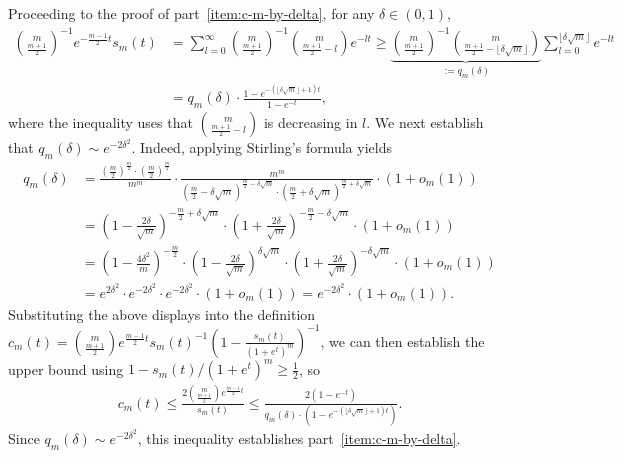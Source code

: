 \documentclass[11pt]{article}
\newcommand{\prn}[1]{\left({#1}\right)} %
\newcommand{\<}{\langle} %
\renewcommand{\>}{\rangle}
\newcommand{\half}{\frac{1}{2}}
\begin{document}
Proceeding to the proof of part~\ref{item:c-m-by-delta},
for any $\delta \in (0, 1)$,
\begin{align*}
  \binom{m}{\frac{m+1}{2}}^{-1} e^{-\frac{m-1}{2}t} s_m(t) & = \sum_{l=0}^\infty \binom{m}{\frac{m+1}{2}}^{-1} \binom{m}{\frac{m+1}{2} - l} e^{-lt} \geq  \underbrace{\binom{m}{\frac{m+1}{2}}^{-1} \binom{m}{\frac{m+1}{2} - \lfloor \delta \sqrt{m} \rfloor}}_{:=q_m(\delta)} \sum_{l=0}^{\lfloor \delta \sqrt{m} \rfloor} e^{-lt} \nonumber 	\\
  & =  q_m(\delta) \cdot \frac{1 - e^{-(\lfloor \delta \sqrt{m} \rfloor + 1) t}}{1 - e^{-t}},
\end{align*}
where the inequality uses that $\binom{m}{\frac{m+1}{2} - l}$ is decreasing
in $l$. We next establish that $q_m(\delta) \sim e^{-2\delta^2}$. Indeed,
applying Stirling's formula yields
\begin{align*}
 	q_m(\delta) &= \frac{\prn{\frac{m}{2}}^{\frac{m}{2}} \cdot \prn{\frac{m}{2}}^{\frac{m}{2}}}{m^m} \cdot  \frac{m^m}{\prn{\frac{m}{2}-\delta \sqrt{m}}^{\frac{m}{2}-\delta \sqrt{m}} \cdot \prn{\frac{m}{2}+\delta \sqrt{m}}^{\frac{m}{2}+\delta \sqrt{m}}} \cdot  (1+o_m(1)) \nonumber \\
 	& = \prn{1-\frac{2\delta}{\sqrt{m}}}^{-\frac{m}{2}+\delta \sqrt{m}} \cdot \prn{1+\frac{2\delta}{\sqrt{m}}}^{-\frac{m}{2}-\delta \sqrt{m}} \cdot (1+o_m(1)) \nonumber \\
 	& = \prn{1-\frac{4\delta^2}{m}}^{-\frac{m}{2}} \cdot \prn{1-\frac{2\delta}{\sqrt{m}}}^{\delta \sqrt{m}} \cdot \prn{1+\frac{2\delta}{\sqrt{m}}}^{-\delta \sqrt{m}} \cdot (1+o_m(1)) \nonumber \\
 	& = e^{2\delta^2} \cdot e^{-2\delta^2} \cdot e^{-2\delta^2} \cdot (1+o_m(1)) = e^{-2 \delta^2} \cdot (1+o_m(1)).
\end{align*}
Substituting the above displays into the definition $c_m(t) =
\binom{m}{\frac{m + 1}{2}} e^{\frac{m - 1}{2} t} s_m(t)^{-1} (1 -
\frac{s_m(t)}{(1 + e^t)^m})^{-1}$, we can then establish the upper bound
using $1 - s_m(t)/(1+e^t)^m \ge \half$, so
\begin{align*}
c_m(t) \leq \frac{2\binom{m}{\frac{m+1}{2}} e^{\frac{m-1}{2}t}}{s_m(t)} \leq \frac{2(1-e^{-t})}{q_m(\delta) \cdot (1 - e^{-(\lfloor \delta \sqrt{m} \rfloor + 1) t})}.
\end{align*}
Since $q_m(\delta) \sim e^{-2\delta^2}$, this inequality
establishes part~\ref{item:c-m-by-delta}.
\end{document}
